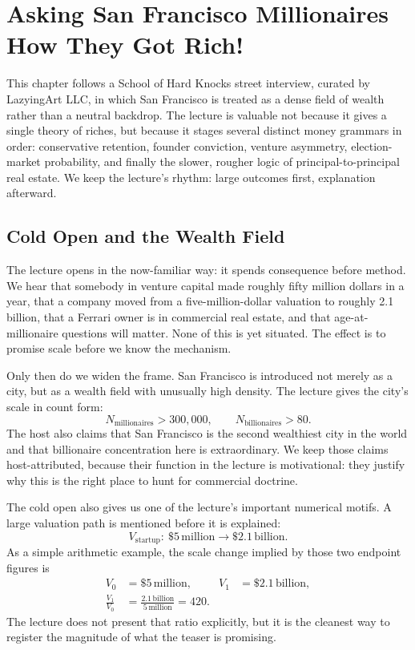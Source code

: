 \chapter{Asking San Francisco Millionaires How They Got Rich!}

This chapter follows a School of Hard Knocks street interview, curated by LazyingArt LLC, in which San Francisco is treated as a dense field of wealth rather than a neutral backdrop. The lecture is valuable not because it gives a single theory of riches, but because it stages several distinct money grammars in order: conservative retention, founder conviction, venture asymmetry, election-market probability, and finally the slower, rougher logic of principal-to-principal real estate. We keep the lecture's rhythm: large outcomes first, explanation afterward.

\section{Cold Open and the Wealth Field}

The lecture opens in the now-familiar way: it spends consequence before method. We hear that somebody in venture capital made roughly fifty million dollars in a year, that a company moved from a five-million-dollar valuation to roughly 2.1 billion, that a Ferrari owner is in commercial real estate, and that age-at-millionaire questions will matter. None of this is yet situated. The effect is to promise scale before we know the mechanism.

Only then do we widen the frame. San Francisco is introduced not merely as a city, but as a wealth field with unusually high density. The lecture gives the city's scale in count form:
\begin{equation}
N_{\text{millionaires}} > 300{,}000,\qquad
N_{\text{billionaires}} > 80.
\end{equation}
The host also claims that San Francisco is the second wealthiest city in the world and that billionaire concentration here is extraordinary. We keep those claims host-attributed, because their function in the lecture is motivational: they justify why this is the right place to hunt for commercial doctrine.

The cold open also gives us one of the lecture's important numerical motifs. A large valuation path is mentioned before it is explained:
\begin{equation}
V_{\text{startup}}:\ \$5\,\text{million}\to \$2.1\,\text{billion}.
\end{equation}
As a simple arithmetic example, the scale change implied by those two endpoint figures is
\begin{align}
V_0 &= \$5\,\text{million}, &
V_1 &= \$2.1\,\text{billion},\\
\frac{V_1}{V_0} &= \frac{2.1\,\text{billion}}{5\,\text{million}} = 420.
\end{align}
The lecture does not present that ratio explicitly, but it is the cleanest way to register the magnitude of what the teaser is promising.


